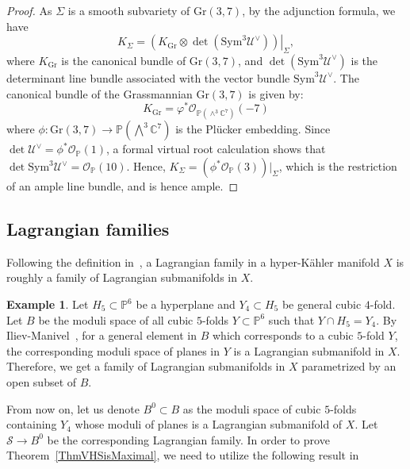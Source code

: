 \documentclass{article}
\theoremstyle{definition}
\newtheorem{eg}[theorem]{Example}
\begin{document}
\begin{proof} As $\Sigma$ is a smooth subvariety of $\mathrm{Gr}(3, 7)$, by the adjunction formula, we have
    \[
    K_{\Sigma} = \left. \left(K_{\mathrm{Gr}} \otimes \det(\mathrm{Sym}^3 \mathcal{U}^\vee)\right) \right|_{\Sigma},
    \]
    where $K_{\mathrm{Gr}}$ is the canonical bundle of $\mathrm{Gr}(3, 7)$, and $\det(\mathrm{Sym}^3 \mathcal{U}^\vee)$ is the determinant line bundle associated with the vector bundle $\mathrm{Sym}^3 \mathcal{U}^\vee$.
The canonical bundle of the Grassmannian \( \text{Gr}(3,7) \) is given by:
\[
K_{\text{Gr}} = \varphi^* \mathcal{O}_{\mathbb{P}(\wedge^3 \mathbb{C}^7)}(-7)
\]
where $\phi: \mathrm{Gr}(3, 7)\to \mathbb P(\bigwedge^3\mathbb C^7)$ is the Plücker embedding. Since $\det\mathcal U^\vee = \phi^*\mathcal O_\mathbb P(1)$, a formal virtual root calculation shows that $\det\mathrm{Sym}^3\mathcal U^\vee = \mathcal O_\mathbb P(10)$. Hence, $K_\Sigma = (\phi^*\mathcal O_\mathbb P(3))|_\Sigma$, which is the restriction of an ample line bundle, and is hence ample.
\end{proof}



\subsection{Lagrangian families}
Following the definition in~\cite{Bai}, a Lagrangian family in a hyper-Kähler manifold $X$ is roughly a family of Lagrangian submanifolds in $X$.

\begin{eg}
    Let $H_5\subset \mathbb P^6$ be a hyperplane and $Y_4\subset H_5$ be general cubic $4$-fold. Let $B$ be the moduli space of all cubic $5$-folds $Y\subset \mathbb P^6$ such that $Y\cap H_5 = Y_4$. By Iliev-Manivel~\cite{IlievManivel}, for a general element in $B$ which corresponds to a cubic $5$-fold $Y$, the corresponding moduli space of planes in $Y$ is a Lagrangian submanifold in $X$. Therefore, we get a family of Lagrangian submanifolds in $X$ parametrized by an open subset of $B$. 
\end{eg}

From now on, let us denote $B^0\subset B$ as the moduli space of cubic $5$-folds containing $Y_4$ whose moduli of planes is a Lagrangian submanifold of $X$. Let $\mathcal S\to B^0$ be the corresponding Lagrangian family. In order to prove Theorem~\ref{ThmVHSisMaximal}, we need to utilize the following result in~\cite[Proposition 2]{Bai}
\end{document}

